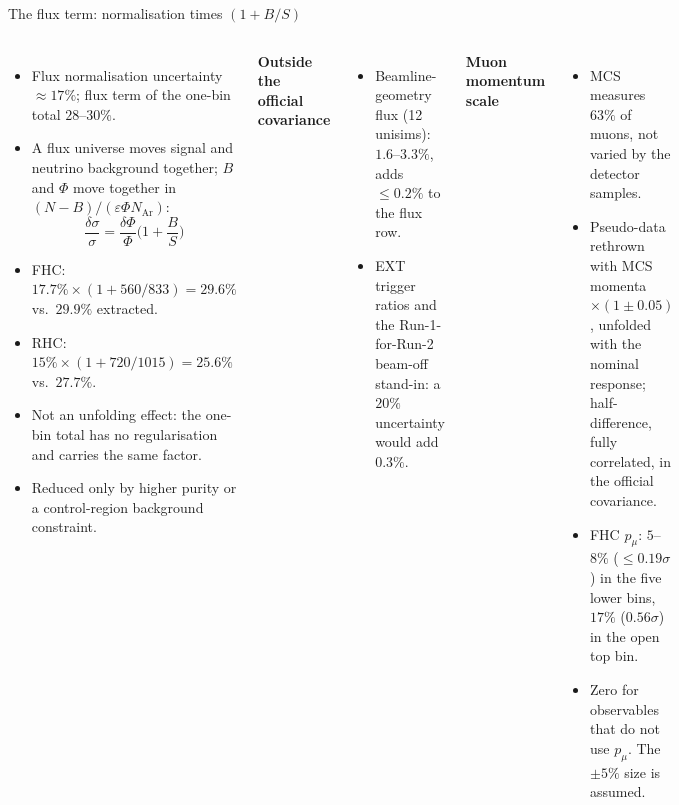 \documentclass[aspectratio=169,10pt]{beamer}
\begin{document}
\begin{frame}{The flux term: normalisation times $(1+B/S)$}
  \begin{columns}[T]
  \small
  \begin{itemize}\setlength\itemsep{3pt}
    \item Flux normalisation uncertainty $\approx17\%$; flux term of the one-bin total $28$--$30\%$.
    \item A flux universe moves signal and neutrino background together; $B$ and $\Phi$ move together in
      $(N-B)/(\varepsilon\Phi N_\mathrm{Ar})$:
      \[\frac{\delta\sigma}{\sigma}=\frac{\delta\Phi}{\Phi}\Big(1+\frac{B}{S}\Big)\]
    \item FHC: $17.7\%\times(1+560/833)=29.6\%$ vs.\ $29.9\%$ extracted.
    \item RHC: $15\%\times(1+720/1015)=25.6\%$ vs.\ $27.7\%$.
    \item Not an unfolding effect: the one-bin total has no regularisation and carries the same factor.
    \item Reduced only by higher purity or a control-region background constraint.
  \end{itemize}
  \small
  \textbf{Outside the official covariance}
  \begin{itemize}\scriptsize\setlength\itemsep{2pt}
    \item Beamline-geometry flux (12 unisims): $1.6$--$3.3\%$, adds $\le0.2\%$ to the flux row.
    \item EXT trigger ratios and the Run-1-for-Run-2 beam-off stand-in: a $20\%$ uncertainty would add
      $0.3\%$.
  \end{itemize}
  \vspace{2mm}
  \textbf{Muon momentum scale}
  \begin{itemize}\scriptsize\setlength\itemsep{2pt}
    \item MCS measures $63\%$ of muons, not varied by the detector samples.
    \item Pseudo-data rethrown with MCS momenta $\times(1\pm0.05)$, unfolded with the nominal response;
      half-difference, fully correlated, in the official covariance.
    \item FHC $p_\mu$: $5$--$8\%$ ($\le0.19\sigma$) in the five lower bins, $17\%$ ($0.56\sigma$) in the open top bin.
    \item Zero for observables that do not use $p_\mu$. The $\pm5\%$ size is assumed.
  \end{itemize}
  \end{columns}
\end{frame}
\end{document}
